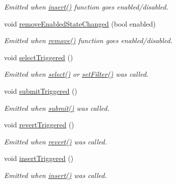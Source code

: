\begin{DoxyCompactItemize}
\begin{DoxyCompactList}\small\item\em Emitted when \hyperlink{classmdt_abstract_sql_table_controller_a82e88e4ff610f73b629bb6d2f229d1aa}{insert()} function goes enabled/disabled. \end{DoxyCompactList}\item 
void \hyperlink{classmdt_abstract_sql_table_controller_adcac9058c974b76574fc5aaed3512c8c}{remove\-Enabled\-State\-Changed} (bool enabled)
\begin{DoxyCompactList}\small\item\em Emitted when \hyperlink{classmdt_abstract_sql_table_controller_a7bbe0f951403acbcc01c99f5916b9204}{remove()} function goes enabled/disabled. \end{DoxyCompactList}\item 
void \hyperlink{classmdt_abstract_sql_table_controller_a4254d5b68587417f53384381f44c29ff}{select\-Triggered} ()
\begin{DoxyCompactList}\small\item\em Emitted when \hyperlink{classmdt_abstract_sql_table_controller_ae26ede862ac54ece9243b264ea22cefb}{select()} or \hyperlink{classmdt_abstract_sql_table_controller_a28b24065dc465fdc0944464708adf63f}{set\-Filter()} was called. \end{DoxyCompactList}\item 
void \hyperlink{classmdt_abstract_sql_table_controller_a07bebc4d4fec28edf3468920fa0cf285}{submit\-Triggered} ()
\begin{DoxyCompactList}\small\item\em Emitted when \hyperlink{classmdt_abstract_sql_table_controller_a14f3e2a91fc30ca0e018944f4f95bc33}{submit()} was called. \end{DoxyCompactList}\item 
void \hyperlink{classmdt_abstract_sql_table_controller_a34238105f2b767e684f309c8af961572}{revert\-Triggered} ()
\begin{DoxyCompactList}\small\item\em Emitted when \hyperlink{classmdt_abstract_sql_table_controller_a36af2665b6d742aba3bc7f6ee6b2a6c4}{revert()} was called. \end{DoxyCompactList}\item 
void \hyperlink{classmdt_abstract_sql_table_controller_a277d087a34874bc6ac42f2e02e9f57d3}{insert\-Triggered} ()
\begin{DoxyCompactList}\small\item\em Emitted when \hyperlink{classmdt_abstract_sql_table_controller_a82e88e4ff610f73b629bb6d2f229d1aa}{insert()} was called. \end{DoxyCompactList}\item 

\end{DoxyCompactItemize}
